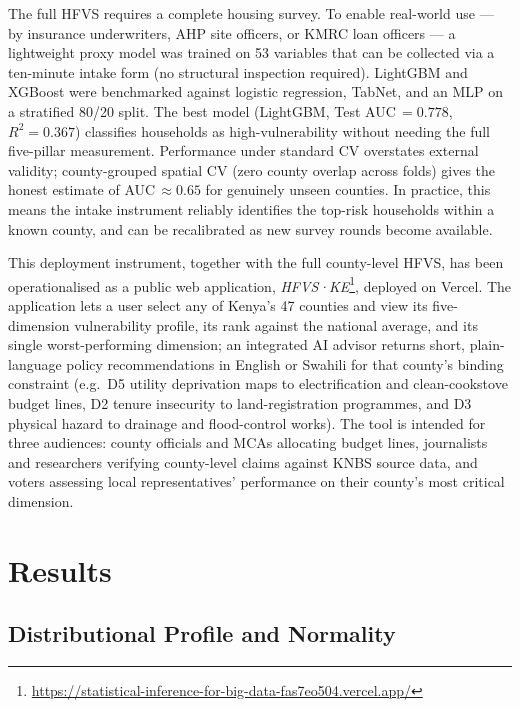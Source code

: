 \documentclass[3p,twocolumn,10pt]{elsarticle}
\begin{document}
The full HFVS requires a complete housing survey. To enable real-world use --- by insurance
underwriters, AHP site officers, or KMRC loan officers --- a lightweight proxy model was
trained on 53 variables that can be collected via a ten-minute intake form (no
structural inspection required). LightGBM and XGBoost were benchmarked against logistic
regression, TabNet, and an MLP on a stratified 80/20 split. The best model (LightGBM,
Test AUC\,$=0.778$, $R^2=0.367$) classifies households as high-vulnerability without
needing the full five-pillar measurement. Performance under standard CV overstates
external validity; county-grouped spatial CV (zero county overlap across folds) gives the
honest estimate of AUC\,$\approx0.65$ for genuinely unseen counties. In practice, this
means the intake instrument reliably identifies the top-risk households within a known
county, and can be recalibrated as new survey rounds become available.

This deployment instrument, together with the full county-level HFVS, has been
operationalised as a public web application,
\textit{HFVS·KE}\footnote{\url{https://statistical-inference-for-big-data-fas7eo504.vercel.app/}},
deployed on Vercel. The application lets a user select any of Kenya's 47 counties and view
its five-dimension vulnerability profile, its rank against the national average, and its
single worst-performing dimension; an integrated AI advisor returns short, plain-language
policy recommendations in English or Swahili for that county's binding constraint (e.g.\
D5 utility deprivation maps to electrification and clean-cookstove budget lines, D2 tenure
insecurity to land-registration programmes, and D3 physical hazard to drainage and
flood-control works). The tool is intended for three audiences: county officials and MCAs
allocating budget lines, journalists and researchers verifying county-level claims against
KNBS source data, and voters assessing local representatives' performance on their
county's most critical dimension.

\section{Results}
\label{sec:results}

\subsection{Distributional Profile and Normality}
\end{document}

